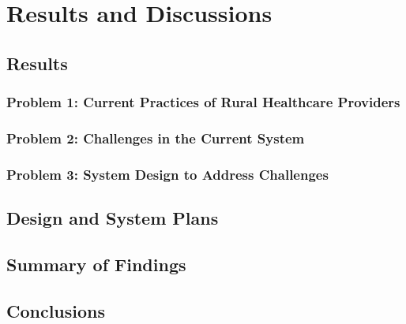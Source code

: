 \documentclass[12pt]{report}
\begin{document}
\clearpage

\chapter{Results and Discussions}

\section*{Results}

\subsection*{Problem 1: Current Practices of Rural Healthcare Providers}

\subsection*{Problem 2: Challenges in the Current System}

\subsection*{Problem 3: System Design to Address Challenges}

\section*{Design and System Plans}

\section*{Summary of Findings}

\section*{Conclusions}
\end{document}
